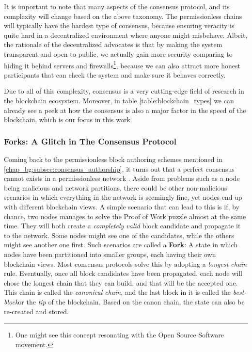 It is important to note that many aspects of the consensus protocol, and its complexity will change
based on the above taxonomy. The permissionless chains will typically have the hardest type of
consensus, because ensuring veracity is quite hard in a decentralized environment where anyone might
misbehave. Albeit, the rationale of the decentralized advocates is that by making the system
transparent and open to public, we actually gain more security comparing to hiding it behind servers
and firewalls\footnote{One might see this concept resonating with the Open Source Software
movement.}, because we can also attract more honest participants that can check the system and make
sure it behaves correctly.

Due to all of this complexity, consensus is a very cutting-edge field of research in the blockchain
ecosystem. Moreover, in table \ref{table:blockchain_types} we can already see a peek at how the
consensus is also a major factor in the speed of the blockchain, which is our focus in this work.

\subsubsection{Forks: A Glitch in The Consensus Protocol}

Coming back to the permissionless block authoring schemes mentioned in
\ref{chap_bg:subsec:consensus_authorship}, it turns out that a perfect consensus cannot exists in a
permissionless network \cite{survey_consensus_Wang_Hoang_Hu_Xiong2019}. Aside from problems such as
a node being malicious and network partitions, there could be other non-malicious scenarios in which
everything in the network is seemingly fine, yet nodes end up with different blockchain views. A
simple scenario that can lead to this is if, by chance, two nodes manages to solve the Proof of Work
puzzle almost at the same time. They will both create a \textit{completely valid} block candidate
and propagate it to the network. Some nodes might see one of the candidates, while the others might
see another one first. Such scenarios are called a \textbf{Fork}: A state in which nodes have been
partitioned into smaller groups, each having their own blockchain views. Most consensus protocols
solve this by adopting a \textit{longest chain} rule. Eventually, once all block candidates have
been propagated, each node will chose the longest chain that they can build, and that will be the
accepted one. This chain is called the \textit{canonical chain}, and the last block in it is called
the \textit{best-block}or the \textit{tip} of the blockchain. Based on the canon chain, the state
can also be re-created and stored.

